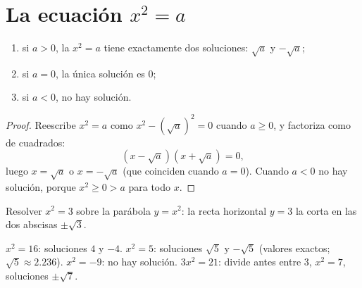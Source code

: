 \section{La ecuación \texorpdfstring{$x^2 = a$}{x2 = a}}

\begin{theorem}[Resolver $x^2 = a$]\label{thm:g9:sqrt:equation}
\begin{enumerate}
  \item si $a > 0$, la  $x^2 = a$ tiene exactamente dos soluciones:
        $\sqrt a$ y $-\sqrt a$;
  \item si $a = 0$, la única solución es $0$;
  \item si $a < 0$, no hay solución.
\end{enumerate}
\end{theorem}

\begin{proof}
Reescribe $x^2 = a$ como $x^2 - \left(\sqrt a\right)^2 = 0$ cuando $a \geq 0$,
y factoriza como  de cuadrados:
\[
\left(x - \sqrt a\right)\left(x + \sqrt a\right) = 0 ,
\]
luego $x = \sqrt a$ o $x = -\sqrt a$ (que coinciden cuando $a = 0$). Cuando
$a < 0$ no hay solución, porque $x^2 \geq 0 > a$ para todo $x$.
\end{proof}

\begin{omfigure}

{\small Resolver $x^2 = 3$ sobre la parábola $y = x^2$: la recta horizontal
$y = 3$ la corta en las dos abscisas $\pm\sqrt3$.}
\end{omfigure}

\begin{example}
$x^2 = 16$: soluciones $4$ y $-4$. \quad
$x^2 = 5$: soluciones $\sqrt5$ y $-\sqrt5$ (valores exactos; $\sqrt5
\approx 2.236$). \quad
$x^2 = -9$: no hay solución. \quad
$3x^2 = 21$: divide antes entre 3, $x^2 = 7$, soluciones $\pm\sqrt7$.
\end{example}

